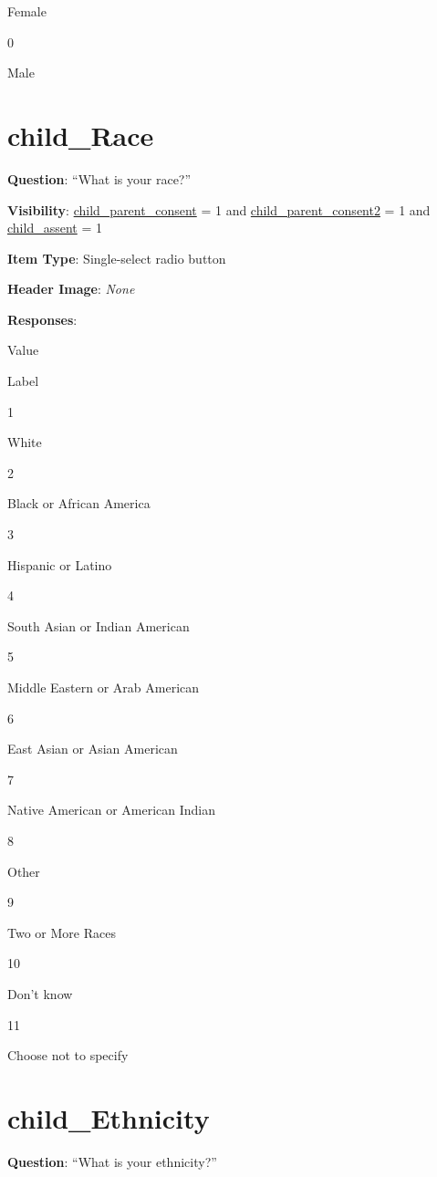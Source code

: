 \documentclass[]{book}
\begin{document}
Female

0

Male

\hypertarget{child_race}{%
\section{child\_Race}\label{child_race}}

\textbf{Question}: ``What is your race?''

\textbf{Visibility}: \protect\hyperlink{child_parent_consent}{child\_parent\_consent} = 1 and \protect\hyperlink{child_parent_consent2}{child\_parent\_consent2} = 1 and \protect\hyperlink{child_assent}{child\_assent} = 1

\textbf{Item Type}: Single-select radio button

\textbf{Header Image}: \emph{None}

\textbf{Responses}:

Value

Label

1

White

2

Black or African America

3

Hispanic or Latino

4

South Asian or Indian American

5

Middle Eastern or Arab American

6

East Asian or Asian American

7

Native American or American Indian

8

Other

9

Two or More Races

10

Don't know

11

Choose not to specify

\hypertarget{child_ethnicity}{%
\section{child\_Ethnicity}\label{child_ethnicity}}

\textbf{Question}: ``What is your ethnicity?''
\end{document}
